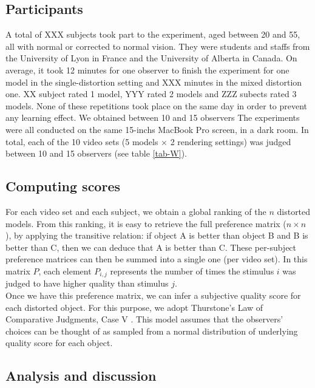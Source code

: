 \subsection{Participants}
A total of XXX subjects took part to the experiment, aged between 20 and 55, all with normal or corrected to normal vision. They were students and staffs from the University of Lyon in France and the University of Alberta in Canada. On average, it took 12 minutes for one observer to finish the experiment for one model in the single-distortion setting and XXX minutes in the mixed distortion one. XX subject rated 1 model, YYY rated 2 models and ZZZ subects rated 3 models. None of these repetitions took place on the same day in order to prevent any learning effect. We obtained between 10 and 15 observers The experiments were all conducted on the same 15-inchs MacBook Pro screen, in a dark room. In total, each of the 10 video sets (5 models $\times$ 2 rendering settings) was judged between 10 and 15 observers (see table \ref{tab-W}).\\
\subsection{Computing scores}
For each video set and each subject, we obtain a global ranking of the $n$ distorted models. From this ranking, it is easy to retrieve the full preference matrix ($n\times n$), by applying the transitive relation: if object A is better than object B and B is better than C, then we can deduce that A is better than C. These per-subject preference matrices can then be summed into a single one (per video set). In this matrix $P$, each element $P_{i,j}$ represents the number of times the stimulus $i$ was judged to have higher quality than stimulus $j$.\\
Once we have this preference matrix, we can infer a subjective quality score for each distorted object. For this purpose, we adopt Thurstone’s Law of Comparative Judgments, Case V \cite{Thurstone1927}. This model assumes that the observers' choices can be thought of as sampled from a normal distribution of underlying quality score for each object. 

\subsection{Analysis and discussion}
